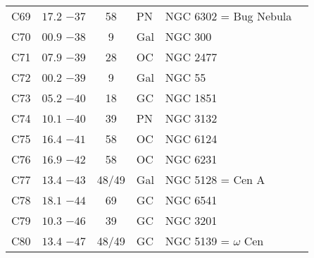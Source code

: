 \begin{table}[p]
\begin{tabular}{lcclll}
C69  &$17.2$ $-37$&58&PN &NGC 6302 = Bug Nebula\\
C70  &$00.9$ $-38$&9&Gal&NGC 300\\
C71  &$07.9$ $-39$&28&OC &NGC 2477\\
C72  &$00.2$ $-39$&9&Gal&NGC 55\\
C73  &$05.2$ $-40$&18&GC &NGC 1851\\
C74  &$10.1$ $-40$&39&PN &NGC 3132\\
C75  &$16.4$ $-41$&58&OC &NGC 6124\\
C76  &$16.9$ $-42$&58&OC &NGC 6231\\
C77  &$13.4$ $-43$&48/49&Gal&NGC 5128 = Cen A\\
C78  &$18.1$ $-44$&69&GC &NGC 6541\\
C79  &$10.3$ $-46$&39&GC &NGC 3201\\
C80  &$13.4$ $-47$&48/49&GC &NGC 5139 = $\omega$ Cen\\
\hline
\end{tabular}
\end{table}

